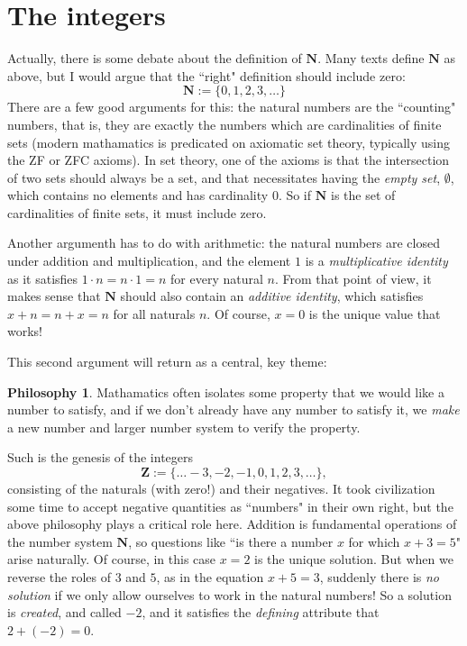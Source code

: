 \documentclass[11pt]{amsart}
\newcommand*{\Z}{\ensuremath{\mathbf{Z}}}
\newcommand*{\N}{\ensuremath{\mathbf{N}}}
\theoremstyle{plain}
\theoremstyle{definition}
\newtheorem{philosophy}[theorem]{Philosophy}
\theoremstyle{remark}
\numberwithin{theorem}{section}
\numberwithin{equation}{section}
\begin{document}
\section{The integers}

Actually, there is some debate about the definition of $\N$.  Many texts define $\N$ as above, but I would argue that the ``right" definition should
include zero:
$$
\N:=\{0,1,2,3,\ldots\}
$$
There are a few good arguments for this: the natural numbers are the ``counting" numbers, that is, they are exactly the numbers which
are cardinalities of finite sets (modern mathamatics is predicated on axiomatic set theory, typically using the ZF or ZFC axioms).
In set theory, one of the axioms is that the intersection of two sets should always be a set, and that necessitates having the {\em empty set}, $\emptyset$,
which contains no elements and has cardinality $0$.  So if $\N$ is the set of cardinalities of finite sets, it must include zero.

Another argumenth has to do with arithmetic: the natural numbers are closed under addition and multiplication, and the element $1$ is a {\em multiplicative identity} as it satisfies $1\cdot n=n\cdot 1=n$ for every natural $n$.  From that point of view, it makes sense that $\N$ should also contain an {\em additive identity}, which satisfies $x + n = n + x = n$ for all naturals $n$.  Of course, $x=0$ is the unique value that works!

This second argument will return as a central, key theme: 
\begin{philosophy}
	Mathamatics often isolates some property that we would like a number to satisfy, and if we don't already have any number to satisfy it, we {\em make} a new number and larger number system to verify the property. 
\end{philosophy}

Such is the genesis of the integers
$$\Z:=\{\ldots -3,-2,-1,0,1,2,3,\ldots\},$$
consisting of the naturals (with zero!) and their negatives.  It took civilization some time to accept negative quantities as ``numbers" in their own right,
but the above philosophy plays a critical role here.  Addition is fundamental operations of the number system $\N$,
so questions like ``is there a number $x$ for which $x+3=5$" arise naturally.  Of course, in this case $x=2$ is the unique solution.
But when we reverse the roles of $3$ and $5$, as in the equation $x+5=3$, suddenly there is {\em no solution} if we only allow ourselves to 
work in the natural numbers!  So a solution is {\em created}, and called $-2$, and it satisfies the {\em defining} attribute that $2 + (-2) = 0$.
\end{document}
